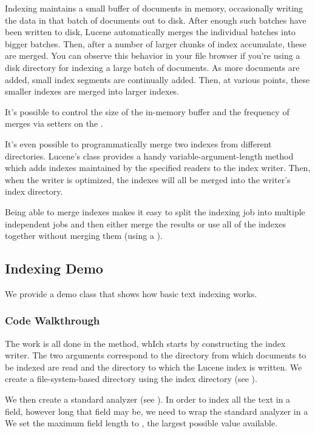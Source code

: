 Indexing maintains a small buffer of documents in memory,
occasionally writing the data in that batch of documents out to disk.
After enough such batches have been written to disk, Lucene
automatically merges the individual batches into bigger batches.
Then, after a number of larger chunks of index accumulate, these are
merged.  You can observe this behavior in your file browser if you're
using a disk directory for indexing a large batch of documents.  As
more documents are added, small index segments are continually added.
Then, at various points, these smaller indexes are merged into larger
indexes.

It's possible to control the size of the in-memory buffer and the
frequency of merges via setters on the .

It's even possible to programmatically merge two indexes from different
directories.  Lucene's  class provides a handy
variable-argument-length method 
which adds indexes maintained by the specified readers to the index
writer.  Then, when the writer is optimized, the indexes will all
be merged into the writer's index directory.  

Being able to merge indexes makes it easy to split the indexing job
into multiple independent jobs and then either merge the results or
use all of the indexes together without merging them (using a
).


\subsection{Indexing Demo}

We provide a demo class  that shows how basic
text indexing works.  

\subsubsection{Code Walkthrough}

The work is all done in the  method, whIch starts by
constructing the index writer.
%
%
The two arguments correspond to the directory from which documents to
be indexed are read and the directory to which the Lucene index is
written.  We create a file-system-based directory using the index
directory (see ).  

We then create a standard analyzer (see ).
In order to index all the text in a field, however long that field may be,
we need to wrap the standard analyzer in a 
We set the maximum field length to , the
largest possible value available.  

